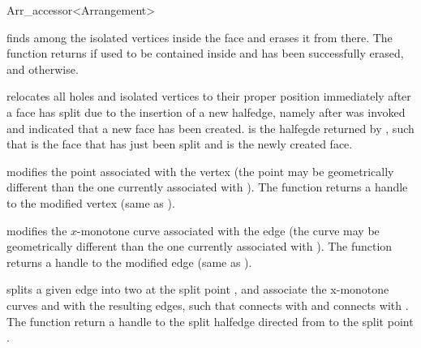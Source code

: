 \begin{ccRefClass}{Arr_accessor<Arrangement>}
\begin{ccAdvanced}
    {finds  among the isolated vertices inside the face  and erases it from
     there. The function returns  if  used to be contained inside
      and has been successfully erased, and  otherwise.}

    {relocates all holes and isolated vertices to their proper position
     immediately after a face has split due to the insertion of a new halfedge,
     namely after  was invoked and indicated that a new face
     has been created.  is the halfegde returned by ,
     such that  is the face that has just been split and
      is the newly created face.}

    {modifies the point associated with the vertex  (the point may be
     geometrically different than the one currently associated with ).
     The function returns a handle to the modified vertex (same as ).
     }

    {modifies the $x$-monotone curve associated with the edge  (the curve may be
     geometrically different than the one currently associated with ).
     The function returns a handle to the modified edge (same as ).
     }
 
    {splits a given edge into two at the split point , and associate the
     x-monotone curves  and  with the resulting edges, such that
      connects  with  and  connects 
      with . The function return a handle to the split 
     halfedge directed from  to the split point .
     }


\end{ccAdvanced}
\end{ccRefClass}
